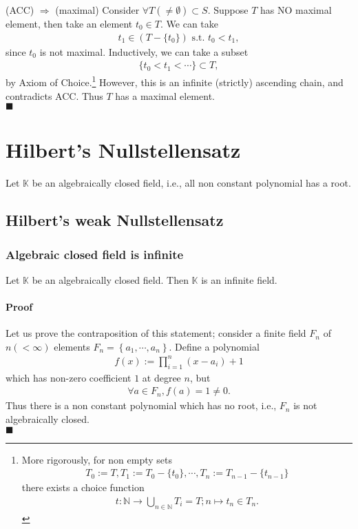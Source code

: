 \documentclass[11pt]{book}
\begin{document}
(ACC) $\Rightarrow$ (maximal)
Consider $\forall T (\neq \emptyset) \subset S$.
Suppose $T$ has NO maximal element, then take an element $t_0 \in T$.
We can take
\begin{eqnarray}
t_1 \in (T - \{t_0\}) \text{ s.t. } t_0 < t_1,
\end{eqnarray}
since $t_0$ is not maximal.
Inductively, we can take a subset
\begin{eqnarray}
\{t_0 < t_1 < \cdots \} \subset T,
\end{eqnarray}
by Axiom of Choice.\footnote{
More rigorously, for non empty sets
\begin{eqnarray}
T_0 := T, T_1 := T_0 - \{t_0\}, \cdots, T_n := T_{n-1}-\{t_{n-1}\}
\end{eqnarray}
there exists a choice function
\begin{eqnarray}
t: \mathbb{N} \to \bigcup_{n \in \mathbb{N}} T_i = T; n \mapsto t_n \in T_n.
\end{eqnarray}

}
However, this is an infinite (strictly) ascending chain, and contradicts ACC.
Thus $T$ has a maximal element.\\
$\blacksquare$

\chapter{Hilbert's Nullstellensatz}
Let $\mathbb{K}$ be an algebraically closed field, i.e., all non constant polynomial has a root.

\section{Hilbert's weak Nullstellensatz}
\subsection{Algebraic closed field is infinite}
Let $\mathbb{K}$ be an algebraically closed field.
Then $\mathbb{K}$ is an infinite field.

\subsubsection{Proof}
Let us prove the contraposition of this statement; consider a finite field $F_n$ of $n (< \infty) $ elements $F_n = \left\{a_1, \cdots, a_n \right\}$.
Define a polynomial
\begin{eqnarray}
f(x) := \prod_{i=1}^n (x-a_i) + 1
\end{eqnarray}
which has non-zero coefficient $1$ at degree $n$, but
\begin{eqnarray}
\forall a \in F_n, f(a) = 1 \neq 0.
\end{eqnarray}
Thus there is a non constant polynomial which has no root, i.e., $F_n$ is not algebraically closed.\\
$\blacksquare$
\end{document}
